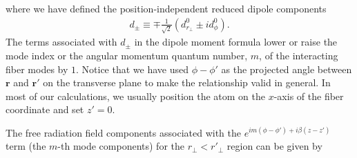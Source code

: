 \documentclass[preprint,aps,pra,onecolumn]{revtex4-1} %
\begin{document}
where we have defined the position-independent reduced dipole components
\begin{align}
d_\pm \equiv \mp \frac{1}{\sqrt{2}}(d^0_{r\!_\perp}\pm id^0_{\phi}).
\end{align}
The terms associated with $d_\pm$ in the dipole moment formula lower or raise the mode index or the angular momentum quantum number, $m$, of the interacting fiber modes by $1$. Notice that we have used $\phi\!-\!\phi'$ as the projected angle between $\mathbf{r}$ and $\mathbf{r}'$ on the transverse plane to make the relationship valid in general. In most of our calculations, we usually position the atom on the $x$-axis of the fiber coordinate and set $z'=0$.


The free radiation field components associated with the $ e^{im(\phi-\phi')+i\beta (z-z')} $ term (the $m$-th mode components) for the $r\!_\perp<r'\!_\perp$ region can be given by
\end{document}
